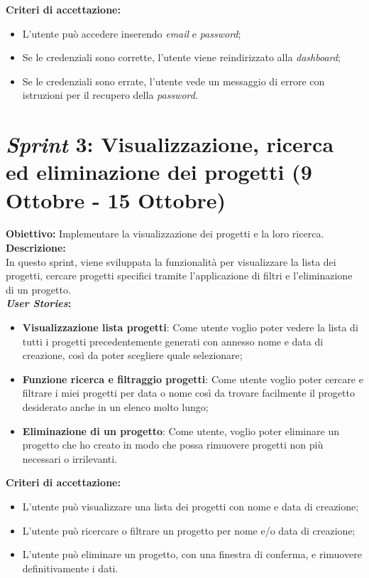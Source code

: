 \noindent \textbf{Criteri di accettazione:}  
\begin{itemize}
    \item L'utente può accedere inserendo \textit{email} e \textit{password};
    \item Se le credenziali sono corrette, l'utente viene reindirizzato alla \textit{dashboard};
    \item Se le credenziali sono errate, l'utente vede un messaggio di errore con istruzioni per il recupero della \textit{password}.
\end{itemize}

\pagebreak
\section*{\textit{Sprint} 3: Visualizzazione, ricerca ed eliminazione dei progetti (9 Ottobre - 15 Ottobre)}
\noindent \textbf{Obiettivo:} Implementare la visualizzazione dei progetti e la loro ricerca.\\

\noindent \textbf{Descrizione:}\\  
\noindent In questo \gls{sprint}, viene sviluppata la funzionalità per visualizzare la lista dei progetti, cercare progetti specifici tramite l’applicazione di filtri e l’eliminazione di un progetto.\\  

\noindent \textbf{\textit{User Stories}:}  
\begin{itemize}
    \item \textbf{Visualizzazione lista progetti}: Come utente voglio poter vedere la lista di tutti i progetti precedentemente generati con annesso nome e data di creazione, così da poter scegliere quale selezionare;
    \item \textbf{Funzione ricerca e filtraggio progetti}: Come utente voglio poter cercare e filtrare i miei progetti per data o nome così da trovare facilmente il progetto desiderato anche in un elenco molto lungo;
    \item \textbf{Eliminazione di un progetto}: Come utente, voglio poter eliminare un progetto che ho creato in modo che possa rimuovere progetti non più necessari o irrilevanti.
\end{itemize}

\noindent \textbf{Criteri di accettazione:}  
\begin{itemize}
    \item L'utente può visualizzare una lista dei progetti con nome e data di creazione;
    \item L'utente può ricercare o filtrare un progetto per nome e/o data di creazione;
    \item L'utente può eliminare un progetto, con una finestra di conferma, e rimuovere definitivamente i dati.
\end{itemize}

